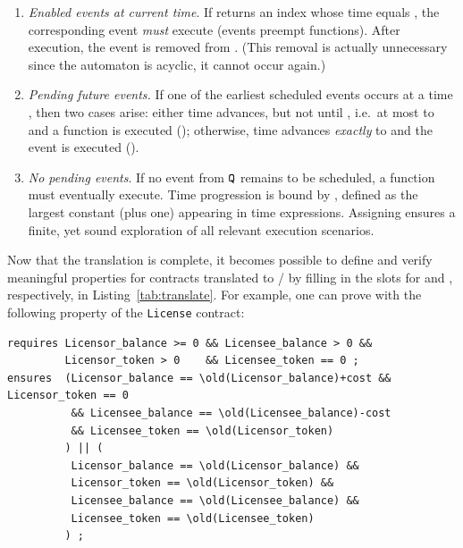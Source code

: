   \begin{enumerate}
  \item \emph{Enabled events at current time}.  If
     returns an index whose time equals
    , the corresponding event \emph{must} execute (events
    preempt functions). After execution, the event is removed from
    . (This removal is actually unnecessary since the
    automaton is acyclic, it cannot occur again.)
  \item \emph{Pending future events.}  If one of the earliest
    scheduled events occurs at a time ,
    then two cases arise: either time advances, but not until ,
    i.e.\ at most to  and a function is
    executed (); otherwise, time advances \emph{exactly}
    to  and the event is executed ().
  \item \emph{No pending events}.  If no event from ${\tt Q}$ remains to be
    scheduled, a function must eventually execute.  Time progression
    is bound by , defined as the largest constant (plus
    one) appearing in time expressions. Assigning  ensures a finite, yet sound exploration of all
    relevant execution scenarios.
\end{enumerate}

Now that the translation is complete, it becomes possible to define and
verify meaningful properties for {\Stipula} contracts translated to
{\JML}/{\Java} by filling in the slots for  and
, respectively, in
Listing~\ref{tab:translate}. For example, one can prove with {\KeY}
the following property of the {\tt License} contract:

{\footnotesize
\begin{lstlisting}[language={[JML]Java},frame=none,numbers=none,mathescape=true,escapechar=']
requires Licensor_balance >= 0 && Licensee_balance > 0 &&
         Licensor_token > 0    && Licensee_token == 0 ;
ensures  (Licensor_balance == \old(Licensor_balance)+cost && Licensor_token == 0 
          && Licensee_balance == \old(Licensee_balance)-cost 
          && Licensee_token == \old(Licensor_token)
         ) || ( 
          Licensor_balance == \old(Licensor_balance) &&
          Licensor_token == \old(Licensor_token) && 
          Licensee_balance == \old(Licensee_balance) &&
          Licensee_token == \old(Licensee_token)
         ) ;
\end{lstlisting}
}


